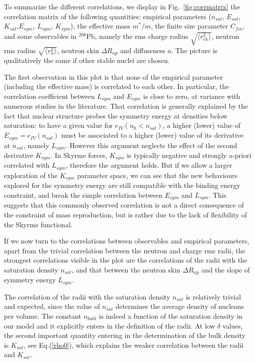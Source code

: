 \documentclass
[aps,prc,twocolumn,showpacs,showkeys,amsmath,floatfix,superscriptaddress]{revtex4}
\begin{document}
{{To summarize the different correlations, we display in Fig.~\ref{fig:corrmatrix} the correlation matrix of the following quantities:
empirical parameters ($ n_{sat}$, $E_{sat}$, $K_{sat}$,$E_{sym}$, $L_{sym}$, $K_{sym}$), the effective mass $m^*/m$, the finite size parameter $C_{fin}$, and some observables in $^{208}$Pb, namely the rms charge radius $\sqrt{ \langle r^2_{ch} \rangle}$,
neutron rms radius $\sqrt {\langle r^2_n \rangle}$,  neutron skin $\Delta R_{np}$  and diffuseness $a$.  
The picture is qualitatively the same if other stable nuclei are chosen.

The first observation in this plot is that none of the empirical parameter (including the effective mass) is correlated to each other. In particular, the correlation coefficient between $L_{sym}$ and $E_{sym}$ is close to zero, at variance with numerous studies in the literature\cite{tsang_rep,KhanMargueron,Ducoin2011,Kortelainen12,Danielewicz14,McDonnel15}.
That correlation is generally explained by the fact\cite{Colo04} that nuclear structure probes the symmetry energy at densities below saturation: to have a given value for $e_{IV}(n_0<n_{sat})$, a higher (lower) value of $E_{sym}=e_{IV}(n_{sat})$ must be associated to a higher (lower) value of its derivative at $n_{sat}$, namely $L_{sym}$. However this argument neglects the effect of the second derivative $K_{sym}$. In Skyrme forces, $K_{sym}$ is typically negative and strongly a-priori correlated with $L_{sym}$, therefore the argument holds. But if we allow a larger exploration of the $K_{sym}$ parameter space, we can see that the new behaviours explored for the symmetry energy are still compatible with the binding energy constraint, and break the simple correlation between $E_{sym}$ and $L_{sym}$. 
This suggests that this commonly observed correlation is not a direct consequence of the constraint of mass reproduction, but is rather due to the lack of flexibility of the Skyrme functional.

If we now turn to the correlations between observables and empirical parameters,
apart from the trivial correlation between the neutron and charge rms radii, the strongest correlations visible in the plot are the correlations of the
radii with the saturation density $n_{sat}$, and that between the neutron skin $\Delta R_{np}$ and the slope of symmetry energy $L_{sym}$. 

The correlation of the radii with the saturation density $ n_{sat}$ is relatively trivial and expected, since the value of $n_{sat}$ determines the average density of nucleons per volume.
The constant $n_{bulk}$ is indeed a function of the saturation density in our model and it explicitly 
enters in the definition of the radii. At low $\delta$ values, the second important quantity entering in the determination of the bulk density is $K_{sat}$, see Eq.(\ref{rho0}), which explains the weaker correlation between the radii and $K_{sat}$.

}}
\end{document}
